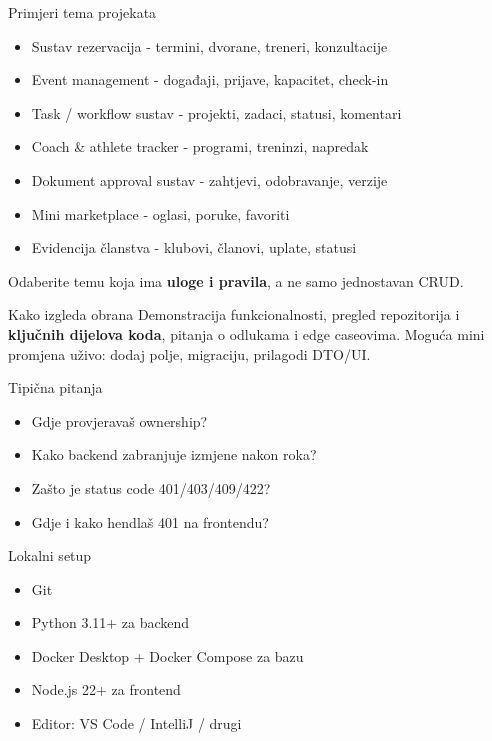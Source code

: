 \begin{frame}{Primjeri tema projekata}
	\begin{itemize}
		\item Sustav rezervacija - termini, dvorane, treneri, konzultacije
		\item Event management - događaji, prijave, kapacitet, check-in
		\item Task / workflow sustav - projekti, zadaci, statusi, komentari
		\item Coach \& athlete tracker - programi, treninzi, napredak
		\item Dokument approval sustav - zahtjevi, odobravanje, verzije
		\item Mini marketplace - oglasi, poruke, favoriti
		\item Evidencija članstva - klubovi, članovi, uplate, statusi
	\end{itemize}

	\vspace{0.6em}
	Odaberite temu koja ima \textbf{uloge i pravila}, a ne samo jednostavan CRUD.
\end{frame}

\begin{frame}{Kako izgleda obrana}
Demonstracija funkcionalnosti, pregled repozitorija i \textbf{ključnih dijelova koda}, pitanja o odlukama i edge caseovima. Moguća mini promjena uživo: dodaj polje, migraciju, prilagodi DTO/UI.

\vspace{0.6em}
\begin{block}{Tipična pitanja}
\begin{itemize}
  \item Gdje provjeravaš ownership?
  \item Kako backend zabranjuje izmjene nakon roka?
  \item Zašto je status code 401/403/409/422?
  \item Gdje i kako hendlaš 401 na frontendu?
\end{itemize}
\end{block}
\end{frame}

\begin{frame}{Lokalni setup}
\begin{itemize}
  \item Git
  \item Python 3.11+ za backend
  \item Docker Desktop + Docker Compose za bazu
  \item Node.js 22+ za frontend
  \item Editor: VS Code / IntelliJ / drugi
\end{itemize}
\end{frame}

